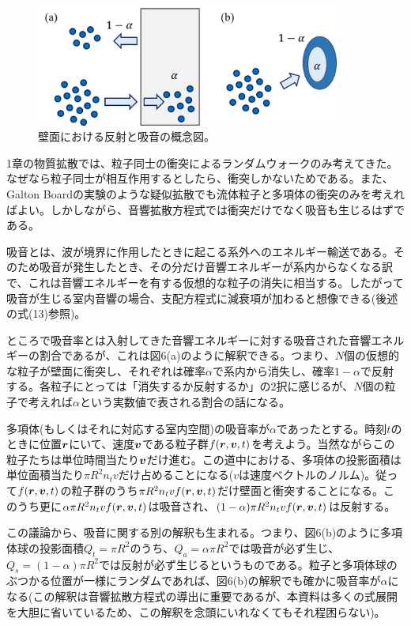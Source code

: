 \documentclass[dvipdfmx, 9pt, a4paper]{jsarticle}
\newcommand{\bm}[1]{{\mbox{\boldmath $#1$}}}
\begin{document}
\begin{figure}[t]
\begin{center}
\includegraphics[width=10cm]{fig6.png}
\caption{壁面における反射と吸音の概念図。}
\end{center}
\end{figure}

1章の物質拡散では、粒子同士の衝突によるランダムウォークのみ考えてきた。なぜなら粒子同士が相互作用するとしたら、衝突しかないためである。また、Galton Boardの実験のような疑似拡散でも流体粒子と多項体の衝突のみを考えればよい。しかしながら、音響拡散方程式では衝突だけでなく吸音も生じるはずである。\par
吸音とは、波が境界に作用したときに起こる系外へのエネルギー輸送である。そのため吸音が発生したとき、その分だけ音響エネルギーが系内からなくなる訳で、これは音響エネルギーを有する仮想的な粒子の消失に相当する。したがって吸音が生じる室内音響の場合、支配方程式に減衰項が加わると想像できる(後述の式(13)参照)。\par
ところで吸音率とは入射してきた音響エネルギーに対する吸音された音響エネルギーの割合であるが、これは図6(a)のように解釈できる。つまり、$N$個の仮想的な粒子が壁面に衝突し、それぞれは確率$\alpha$で系内から消失し、確率$1-\alpha$で反射する。各粒子にとっては「消失するか反射するか」の2択に感じるが、$N$個の粒子で考えれば$\alpha$という実数値で表される割合の話になる。\par
多項体(もしくはそれに対応する室内空間)の吸音率が$\alpha$であったとする。時刻$t$のときに位置$\bm r$にいて、速度$\bm v$である粒子群$f(\bm r, \bm v, t)$を考えよう。当然ながらこの粒子たちは単位時間当たり$\bm v$だけ進む。この道中における、多項体の投影面積は単位面積当たり$\pi R^2n_t v$だけ占めることになる($v$は速度ベクトルのノルム)。従って$f(\bm r, \bm v, t)$の粒子群のうち$\pi R^2n_t vf(\bm r, \bm v, t)$だけ壁面と衝突することになる。このうち更に$\alpha\pi R^2n_t vf(\bm r, \bm v, t)$は吸音され、$(1-\alpha)\pi R^2n_t vf(\bm r, \bm v, t)$は反射する。\par
この議論から、吸音に関する別の解釈も生まれる。つまり、図6(b)のように多項体球の投影面積$Q_t = \pi R^2$のうち、$Q_a = \alpha \pi R^2$では吸音が必ず生じ、$Q_s=(1-\alpha)\pi R^2$では反射が必ず生じるというものである。粒子と多項体球のぶつかる位置が一様にランダムであれば、図6(b)の解釈でも確かに吸音率が$\alpha$になる(この解釈は音響拡散方程式の導出に重要であるが、本資料は多くの式展開を大胆に省いているため、この解釈を念頭にいれなくてもそれ程困らない)。
\end{document}
